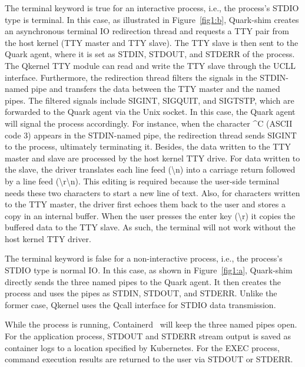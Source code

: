 The terminal keyword is true for an interactive process, i.e., the process’s STDIO type is terminal. In this case, as illustrated in Figure~\ref{fig1:b}, Quark-shim creates an asynchronous terminal IO redirection thread and requests a TTY pair from the host kernel (TTY master and TTY slave). The TTY 
slave is then sent to the Quark agent, where it is set as STDIN, STDOUT, and STDERR of the process. The Qkernel TTY module can read and write the TTY slave through the UCLL interface. Furthermore, the redirection thread  filters the signals in the STDIN-named pipe and 
transfers the data between the TTY master and the named pipes. The filtered signals include SIGINT, SIGQUIT, and SIGTSTP, which are forwarded to the Quark agent via the Unix socket. In this case, the Quark agent will signal the process accordingly. For instance, when the character \textasciicircum C (ASCII code 3) appears in 
the STDIN-named pipe, the redirection thread sends SIGINT to the process, ultimately terminating it. Besides, the data written to the TTY master and slave are processed by the host kernel TTY drive. For data written to the slave, the driver translates each line feed (\textbackslash n) into a carriage return
 followed by a line feed (\textbackslash r\textbackslash n). This editing is required because the user-side terminal needs these two characters to start a new line of text. Also, for characters written to the TTY master, the driver first echoes them back to the user and stores a copy in an internal buffer. When the user presses the enter key (\textbackslash r) it 
 copies the buffered data to the TTY slave. As such, the terminal will not work without the host kernel TTY driver.

The terminal keyword is false for a non-interactive process, i.e., the process’s STDIO type is normal IO. In this case, as shown in Figure~\ref{fig1:a}, Quark-shim directly sends the three named pipes to the Quark agent. It then creates the process and uses the pipes as STDIN, STDOUT, and STDERR. 
Unlike the former case, Qkernel uses the Qcall interface for STDIO data transmission.

While the process is running, Containerd~\cite*{containerd} will keep the three named pipes open. For the application process, STDOUT and STDERR stream output is saved as container logs to a location specified by Kubernetes. For the EXEC process, command execution results are returned to the user via 
STDOUT or STDERR.


